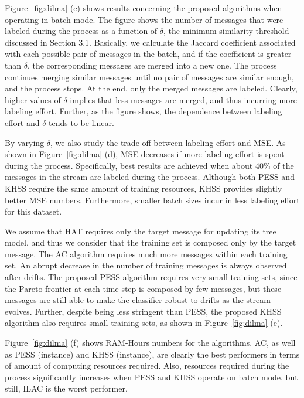 Figure~\ref{fig:dilma} (c) shows results concerning the proposed algorithms when operating in batch mode. The figure shows the number of messages that were labeled during the process as a function of $\delta$, the minimum similarity threshold discussed in Section 3.1. Basically, we calculate the Jaccard coefficient associated with each possible pair of messages in the batch, and if the coefficient is greater than $\delta$, the corresponding messages are merged into a new one. The process continues merging similar messages until no pair of messages are similar enough, and the process stops. At the end, only the merged messages are labeled. Clearly, higher values of $\delta$ implies that less messages are merged, and thus incurring more labeling effort. Further, as the figure shows, the dependence between labeling effort and $\delta$ tends to be linear.

By varying $\delta$, we also study the trade-off between labeling effort and MSE. As shown in Figure~\ref{fig:dilma} (d), MSE decreases if more labeling effort is spent during the process. Specifically, best results are achieved when about 40\% of the messages in the stream are labeled during the process. Although both PESS and KHSS require the same amount of training resources, KHSS provides slightly better MSE numbers. Furthermore, smaller batch sizes incur in less labeling effort for this dataset.

We assume that HAT requires only the target message for updating its tree model, and thus we consider that the training set is composed only by the target message. The AC algorithm requires much more
messages within each training set. An abrupt decrease in the number of training messages is always observed after drifts.
The proposed PESS algorithm requires very small training sets, since the Pareto frontier at each time step is composed by few messages, but these messages are still able to make the classifier robust to drifts as the stream evolves. Further, despite being less stringent than PESS, the proposed KHSS algorithm also requires small training sets, as shown in Figure~\ref{fig:dilma} (e).

Figure~\ref{fig:dilma} (f) shows RAM-Hours numbers for the algorithms. AC, as well as PESS (instance) and KHSS (instance), are clearly the best performers in terms of amount of computing resources required. Also, resources required during the process significantly increases when PESS and KHSS operate on batch mode, but still, ILAC is the worst performer.

